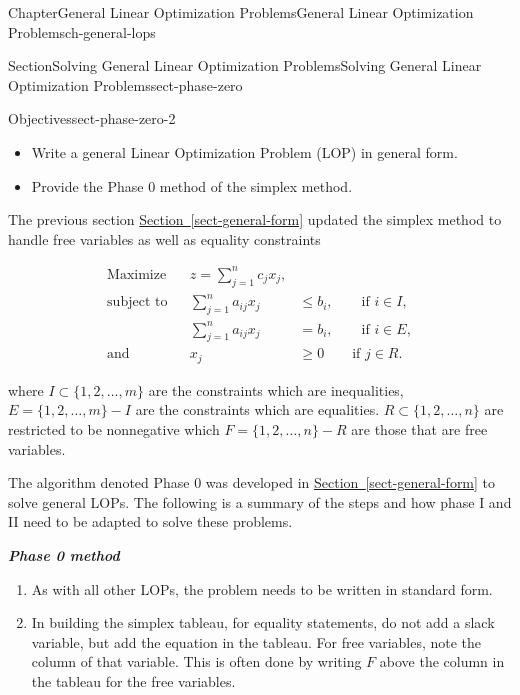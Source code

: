 \documentclass[oneside,10pt,]{book}
\newcommand{\xreffont}{\relax}
\newcommand{\alert}[1]{\textbf{\textit{#1}}}
\numberwithin{equation}{section}
\newcommand{\amp}{&}
\begin{document}
\begin{chapterptx}{Chapter}{General Linear Optimization Problems}{}{General Linear Optimization Problems}{}{}{ch-general-lops}
\typeout{************************************************}
%
\begin{sectionptx}{Section}{Solving General Linear Optimization Problems}{}{Solving General Linear Optimization Problems}{}{}{sect-phase-zero}
\begin{objectives}{Objectives}{sect-phase-zero-2}
%
\begin{itemize}[label=\textbullet]
\item{}Write a general Linear Optimization Problem (LOP) in general form.%
\item{}Provide the Phase 0 method of the simplex method.%
\end{itemize}
\end{objectives}
The previous section \hyperref[sect-general-form]{Section~{\xreffont\ref{sect-general-form}}} updated the simplex method to handle free variables as well as equality constraints%
\par
%
\begin{equation*}
\begin{aligned} \text{Maximize} \amp\amp z  = \sum_{j=1}^n c_j x_j,\amp \\ \text{subject to} \amp\amp \sum_{j=1}^n a_{ij} x_j \amp\leq b_i, \qquad \text{if $i \in I$}, \\ \amp\amp \sum_{j=1}^n a_{ij} x_j \amp= b_i, \qquad \text{if $i \in E$}, \\ \text{and} \amp\amp x_j \amp\geq 0 \qquad \text{if $j \in R$.} \end{aligned}
\end{equation*}
%
\par
where \(I \subset \{1,2,\ldots,m\}\) are the constraints which are inequalities, \(E = \{1,2,\ldots,m\}-I\) are the constraints which are equalities. \(R \subset \{1,2,\ldots, n\}\) are restricted to be nonnegative which \(F = \{1,2,\ldots, n\} - R\) are those that are free variables.%
\par
The algorithm denoted Phase 0 was developed in \hyperref[sect-general-form]{Section~{\xreffont\ref{sect-general-form}}} to solve general LOPs. The following is a summary of the steps and how phase I and II need to be adapted to solve these problems.%
\par
\alert{Phase 0 method}%
\par
%
\begin{enumerate}
\item{}As with all other LOPs, the problem needs to be written in standard form.%
\item{}In building the simplex tableau, for equality statements, do not add a slack variable, but add the equation in the tableau. For free variables, note the column of that variable. This is often done by writing \(F\) above the column in the tableau for the free variables.%

\end{enumerate}
\end{sectionptx}
\end{chapterptx}
\end{document}
